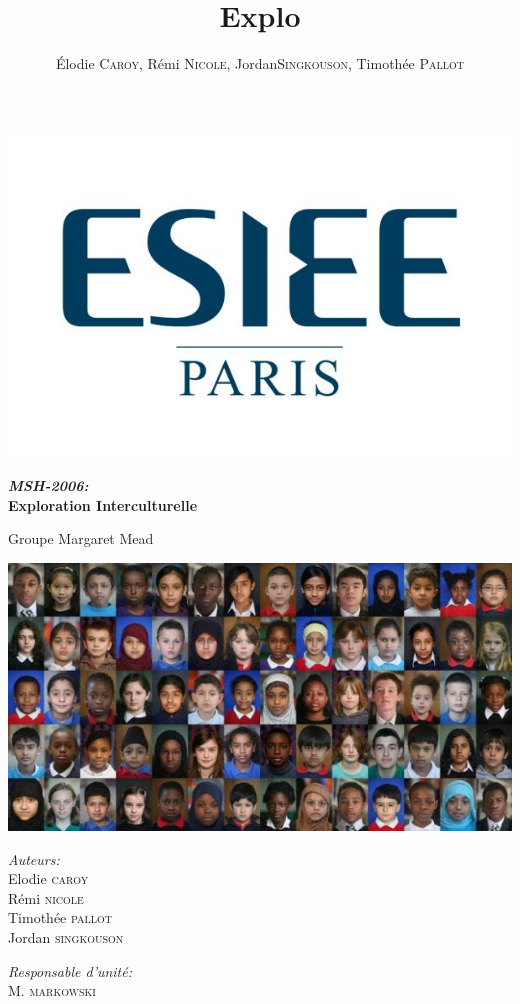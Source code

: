 \documentclass[12pt]{book}
\title{Explo}
\author{\'Elodie \textsc{Caroy}, Rémi \textsc{Nicole}, Jordan\textsc{Singkouson}, Timothée \textsc{Pallot}}
\date{}
\begin{document}
\begin{titlepage}
	\begin{sffamily}
	\includegraphics[scale=0.3]{esiee.jpg}
	\begin{center}

	\vspace*{2cm}
	{\huge \bfseries \emph{MSH-2006:}\\
	Exploration Interculturelle \\[0.4cm]}
	\begin{center}
	\Large Groupe Margaret Mead
	\end{center}
	
	
	\includegraphics[scale=0.8]{races-620x330.jpg}
	\newline
	
    \begin{minipage}{0.4\textwidth}
      \begin{flushleft} \large
				\emph{Auteurs:}\\
        Elodie \textsc{caroy}\\
				Rémi \textsc{nicole}\\
				Timothée \textsc{pallot}\\
				Jordan \textsc{singkouson}
      \end{flushleft}
    \end{minipage}
    \begin{minipage}{0.4\textwidth}
      \begin{flushright} \large
        \emph{Responsable d'unité:}\\
				M. \textsc{markowski}\\
				

\end{flushright}
\end{minipage}
\end{center}
\end{sffamily}
\end{titlepage}
\end{document}
